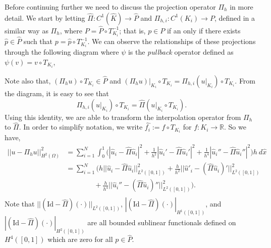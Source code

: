 \documentclass[11pt]{article}
\newcommand{\wh}{\widehat}
\begin{document}
Before continuing further we need to discuss the projection operator $\Pi_h$ in more detail.
We start by letting $\widehat{
\Pi} : C^1(\wh{K}) \to \wh{P}$ and $\Pi_{h,i} : C^1(K_i) \to P$, defined in a similar way as $\Pi_h$, where $P = \wh{P} \circ T^{-1}_{K_i}$; that is, $p \in P$ if an only if there exists $\hat{p} \in \wh{P}$ such that $p = \hat{p} \circ T_{K_i}^{-1}$.
We can observe the relationships of these projections through the following diagram where $\psi$ is the \textit{pullback} operator defined as $\psi(v) = v \circ T_{K_i}$,
\begin{center}
\end{center}
Note also that, $(\Pi_h u) \circ T_{K_i} \in \wh{P}$ and $(\Pi_h u)|_{K_i} \circ T_{K_i} = \Pi_{h,i}(u|_{K_i}) \circ T_{K_i}$.
From the diagram, it is easy to see that 
\begin{equation}
    \Pi_{h,i}(u|_{K_i}) \circ T_{K_i} = \widehat{\Pi}(u|_{K_i} \circ T_{K_i}).
\end{equation}
Using this identity, we are able to transform the interpolation operator from $\Pi_h$ to $\widehat{\Pi}$.
In order to simplify notation, we write $\widehat{f_i} := f\circ T_{K_i}$ for $f : K_i \to \mathbb{R}$.
So we have,
\begin{align*}
    ||u - \Pi_h u||^2_{H^2(\Omega)} &= \sum_{i=1}^N \int_0^1 \big( |\widehat{u}_i - \widehat{\Pi} \widehat{u}_i|^2 + \frac{1}{h^2}|\widehat{u}_i' - \widehat{\Pi} \widehat{u}_i'|^2 + \frac{1}{h^4}|\widehat{u}_i'' - \widehat{\Pi} \widehat{u}_i''|^2 \big) h \: d\hat{x} \\
    &= \sum_{i=1}^N \Big( h ||\widehat{u}_i - \widehat{\Pi} \widehat{u}_i||^2_{L^2([0,1])} + \frac{h}{h^2}||\widehat{u}'_i - (\widehat{\Pi} \widehat{u}_i)'||^2_{L^2([0,1])} \\
    &\qquad\qquad + \frac{h}{h^4}||\widehat{u}_i'' - (\widehat{\Pi} \widehat{u}_i)''||^2_{L^2([0,1])} \Big). \\
\end{align*}
Note that $||(\text{Id} - \wh{\Pi})(\cdot)||_{L^2([0,1])}$, $|(\text{Id} - \wh{\Pi})(\cdot)|_{H^1([0,1])}$, and $|(\text{Id} - \wh{\Pi})(\cdot)|_{H^2([0,1])}$ are all bounded sublinear functionals defined on $H^4([0,1])$ which are zero for all $p \in \wh{P}$.
\end{document}
